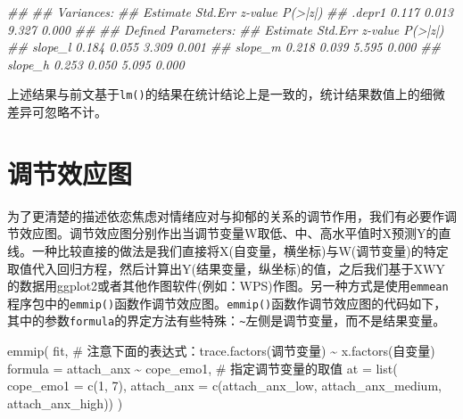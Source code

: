 \documentclass[
  chinese-hans,
  letterpaper,
  DIV=11,
  numbers=noendperiod]{scrartcl}
\newenvironment{Shaded}{\begin{snugshade}}{\end{snugshade}}
\newcommand{\AttributeTok}[1]{\textcolor[rgb]{0.40,0.45,0.13}{#1}}
\newcommand{\CommentTok}[1]{\textcolor[rgb]{0.37,0.37,0.37}{#1}}
\newcommand{\DecValTok}[1]{\textcolor[rgb]{0.68,0.00,0.00}{#1}}
\newcommand{\DocumentationTok}[1]{\textcolor[rgb]{0.37,0.37,0.37}{\textit{#1}}}
\newcommand{\FunctionTok}[1]{\textcolor[rgb]{0.28,0.35,0.67}{#1}}
\newcommand{\NormalTok}[1]{\textcolor[rgb]{0.00,0.23,0.31}{#1}}
\newcommand{\SpecialCharTok}[1]{\textcolor[rgb]{0.37,0.37,0.37}{#1}}
\begin{document}
\begin{Shaded}
\begin{Highlighting}[numbers=left,,]
\DocumentationTok{\#\# }
\DocumentationTok{\#\# Variances:}
\DocumentationTok{\#\#                    Estimate  Std.Err  z{-}value  P(\textgreater{}|z|)}
\DocumentationTok{\#\#    .depr1             0.117    0.013    9.327    0.000}
\DocumentationTok{\#\# }
\DocumentationTok{\#\# Defined Parameters:}
\DocumentationTok{\#\#                    Estimate  Std.Err  z{-}value  P(\textgreater{}|z|)}
\DocumentationTok{\#\#     slope\_l           0.184    0.055    3.309    0.001}
\DocumentationTok{\#\#     slope\_m           0.218    0.039    5.595    0.000}
\DocumentationTok{\#\#     slope\_h           0.253    0.050    5.095    0.000}
\end{Highlighting}
\end{Shaded}

上述结果与前文基于\texttt{lm()}的结果在统计结论上是一致的，统计结果数值上的细微差异可忽略不计。

\section{调节效应图}\label{ux8c03ux8282ux6548ux5e94ux56fe}

为了更清楚的描述依恋焦虑对情绪应对与抑郁的关系的调节作用，我们有必要作调节效应图。调节效应图分别作出当调节变量W取低、中、高水平值时X预测Y的直线。一种比较直接的做法是我们直接将X(自变量，横坐标)与W(调节变量)的特定取值代入回归方程，然后计算出Y(结果变量，纵坐标)的值，之后我们基于XWY的数据用ggplot2或者其他作图软件(例如：WPS)作图。另一种方式是使用\texttt{emmean}程序包中的\texttt{emmip()}函数作调节效应图。\texttt{emmip()}函数作调节效应图的代码如下，其中的参数\texttt{formula}的界定方法有些特殊：\texttt{\textasciitilde{}}左侧是调节变量，而不是结果变量。

\begin{Shaded}
\begin{Highlighting}[numbers=left,,]
\FunctionTok{emmip}\NormalTok{(}
\NormalTok{  fit,}
  \CommentTok{\# 注意下面的表达式：trace.factors(调节变量) \textasciitilde{} x.factors(自变量)}
  \AttributeTok{formula =}\NormalTok{ attach\_anx }\SpecialCharTok{\textasciitilde{}}\NormalTok{ cope\_emo1,}
  \CommentTok{\# 指定调节变量的取值}
  \AttributeTok{at =} \FunctionTok{list}\NormalTok{(}
    \AttributeTok{cope\_emo1 =} \FunctionTok{c}\NormalTok{(}\DecValTok{1}\NormalTok{, }\DecValTok{7}\NormalTok{),}
    \AttributeTok{attach\_anx =} \FunctionTok{c}\NormalTok{(attach\_anx\_low, attach\_anx\_medium, attach\_anx\_high))}
\NormalTok{)}
\end{Highlighting}
\end{Shaded}
\end{document}
